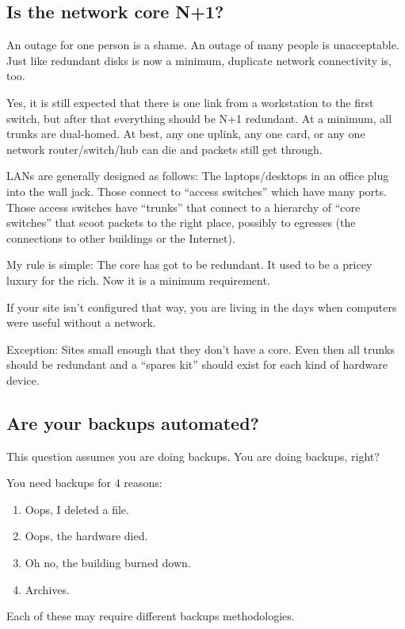 \documentclass{article}
\begin{document}
\subsection{Is the network core N+1?}
An outage for one person is a shame. An outage of many people is unacceptable. Just like redundant disks is now a minimum, duplicate network connectivity is, too.

Yes, it is still expected that there is one link from a workstation to the first switch, but after that everything should be N+1 redundant. At a minimum, all trunks are dual-homed. At best, any one uplink, any one card, or any one network router/switch/hub can die and packets still get through.

LANs are generally designed as follows: The laptops/desktops in an office plug into the wall jack. Those connect to ``access switches'' which have many ports. Those access switches have ``trunks'' that connect to a hierarchy of ``core switches'' that scoot packets to the right place, possibly to egresses (the connections to other buildings or the Internet).

My rule is simple: The core has got to be redundant. It used to be a pricey luxury for the rich. Now it is a minimum requirement.

If your site isn't configured that way, you are living in the days when computers were useful without a network.

Exception: Sites small enough that they don't have a core. Even then all trunks should be redundant and a ``spares kit'' should exist for each kind of hardware device.

\subsection{Are your backups automated? \Checkmark}
This question assumes you are doing backups. You are doing backups, right?

You need backups for 4 reasons:

\begin{enumerate}
    \item Oops, I deleted a file.
    \item Oops, the hardware died.
    \item Oh no, the building burned down.
    \item Archives.
\end{enumerate}

Each of these may require different backups methodologies.
\end{document}

